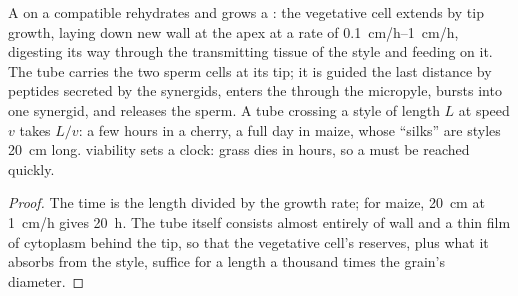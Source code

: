 \begin{theorem}\label{thm:b2:angiosperm-reproduction:tube}
A  on a compatible  rehydrates and grows a
\emph{}: the vegetative cell extends by tip growth,
laying down new wall at the apex at a rate of \qtyrange{0.1}{1}{cm/h},
digesting its way through the transmitting tissue of the style and
feeding on it. The tube carries the two sperm cells at its tip; it
is guided the last distance by peptides secreted by the synergids,
enters the  through the micropyle, bursts into one synergid,
and releases the sperm. A tube crossing a style of length $L$ at
speed $v$ takes $L/v$: a few hours in a cherry, a full day in maize,
whose ``silks'' are styles \qty{20}{cm} long.  viability sets
a clock: grass  dies in hours, so a  must be reached
quickly.
\end{theorem}
\begin{proof}
The time is the length divided by the growth rate; for maize,
\qty{20}{cm} at \qty{1}{cm/h} gives \qty{20}{h}. The tube itself
consists almost entirely of wall and a thin film of cytoplasm behind
the tip, so that the vegetative cell's reserves, plus what it
absorbs from the style, suffice for a length a thousand times the
grain's diameter.
\end{proof}

